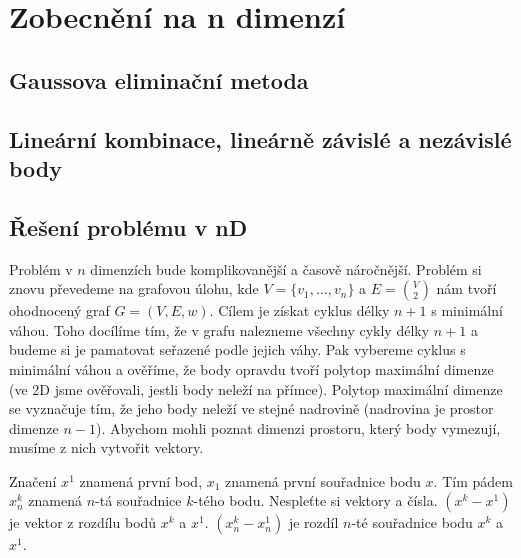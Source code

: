 \chapter{Zobecnění na n dimenzí}
\label{chap:n_dimenzi}
\section{Gaussova eliminační metoda}

\section{Lineární kombinace, lineárně závislé a nezávislé body}

\section{Řešení problému v nD}
Problém v $n$ dimenzích bude komplikovanější a časově náročnější. Problém si znovu převedeme na grafovou úlohu, kde $V = \{v_1,\ldots, v_n\}$ a $E = \binom{V}{2}$ nám tvoří ohodnocený graf $G = (V, E, w)$. Cílem je získat cyklus délky $n+1$ s minimální váhou. Toho docílíme tím, že v grafu nalezneme všechny cykly délky $n+1$ a budeme si je pamatovat seřazené podle jejich váhy. Pak vybereme cyklus s minimální váhou a ověříme, že body opravdu tvoří polytop maximální dimenze (ve 2D jsme ověřovali, jestli body neleží na přímce). Polytop maximální dimenze se vyznačuje tím, že jeho body neleží ve stejné nadrovině (nadrovina je prostor dimenze $n-1$). Abychom mohli poznat dimenzi prostoru, který body vymezují, musíme z nich vytvořit vektory.
\begin{varovani}
  \label{varovani:varovani_index}
  Značení $x^1$ znamená první bod, $x_1$ znamená první souřadnice bodu $x$. Tím pádem $x^k_n$ znamená $n$-tá souřadnice $k$-tého bodu. Nespleťte si vektory a čísla. $(x^k-x^1)$ je vektor z rozdílu bodů $x^k$ a $x^1$. $(x^k_n - x^1_n)$ je rozdíl $n$-té souřadnice bodu $x^k$ a $x^1$. 
\end{varovani}

